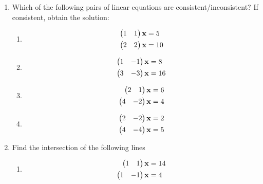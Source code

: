 \documentclass[journal,12pt,twocolumn]{IEEEtran}
\renewcommand\thesection{\arabic{section}}
\begin{document}
\begin{enumerate}[label=\thesection.\arabic*.,ref=\thesection.\theenumi]
\item Which of the following pairs of linear equations are consistent/inconsistent? If consistent, obtain the solution:
%
\begin{enumerate}[itemsep=2pt]
\item
\begin{align}
\begin{split}
\begin{pmatrix}1 & 1 \end{pmatrix}\mathbf{x}&=5
\\
\begin{pmatrix}2 & 2 \end{pmatrix}\mathbf{x}&=10
\end{split}
\label{linform/2/8/1.0.1}
\end{align}
\item
\begin{align}
\begin{split}
\begin{pmatrix}1 & -1 \end{pmatrix}\mathbf{x}&=8
\\
\begin{pmatrix}3 & -3 \end{pmatrix}\mathbf{x}&=16
\end{split}
\label{linform/2/8/1.0.2}
\end{align}
\item
\begin{align}
\begin{split}
\begin{pmatrix}2 & 1 \end{pmatrix}\mathbf{x}&=6
\\
\begin{pmatrix}4 & -2 \end{pmatrix}\mathbf{x}&=4
\end{split}
\label{linform/2/8/2/1.0.1}
\end{align}
\item
\begin{align}
\begin{split}
\begin{pmatrix}2 & -2 \end{pmatrix}\mathbf{x}&=2
\\
\begin{pmatrix}4 & -4 \end{pmatrix}\mathbf{x}&=5
\end{split}
\label{linform/2/8/2/1.0.2}
\end{align}
\end{enumerate}
%
\solution
%
%
\item Find the intersection of the following lines
%
\begin{enumerate}[itemsep=2pt]
\item
\begin{align}
\begin{split}
\begin{pmatrix}1 & 1 \end{pmatrix}\mathbf{x}&=14
\\
\begin{pmatrix}1 & -1 \end{pmatrix}\mathbf{x}&=4
\end{split}
\label{linform/10/ab/1.0.1}
\end{align}

\end{enumerate}
\end{enumerate}
\end{document}
